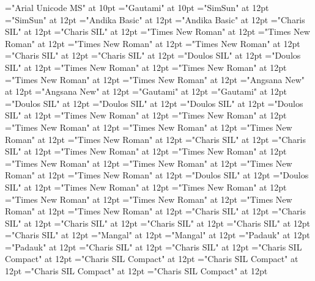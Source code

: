 \documentclass[a4paper,twoside]{article}
\begin{document}
\font\xitemhi="Arial Unicode MS" at 10pt
\font\xitemte="Gautami" at 10pt
\font\spanzhCN="SimSun" at 12pt
\font\divzhCN="SimSun" at 12pt
\font\spanzhCNpinyin="Andika Basic" at 12pt
\font\divzhCNpinyin="Andika Basic" at 12pt
\font\spanvi="Charis SIL" at 12pt
\font\divvi="Charis SIL" at 12pt
\font\spanur="Times New Roman" at 12pt
\font\divur="Times New Roman" at 12pt
\font\spanurxind="Times New Roman" at 12pt
\font\divurxind="Times New Roman" at 12pt
\font\spantr="Charis SIL" at 12pt
\font\divtr="Charis SIL" at 12pt
\font\spantrfonipa="Doulos SIL" at 12pt
\font\divtrfonipa="Doulos SIL" at 12pt
\font\spantrfonipaxemic="Times New Roman" at 12pt
\font\divtrfonipaxemic="Times New Roman" at 12pt
\font\spantpi="Times New Roman" at 12pt
\font\divtpi="Times New Roman" at 12pt
\font\spanth="Angsana New" at 12pt
\font\divth="Angsana New" at 12pt
\font\spante="Gautami" at 12pt
\font\divte="Gautami" at 12pt
\font\spanseh="Doulos SIL" at 12pt
\font\divseh="Doulos SIL" at 12pt
\font\spansehfonipaxetic="Doulos SIL" at 12pt
\font\divsehfonipaxetic="Doulos SIL" at 12pt
\font\spanru="Times New Roman" at 12pt
\font\divru="Times New Roman" at 12pt
\font\spanqvz="Times New Roman" at 12pt
\font\divqvz="Times New Roman" at 12pt
\font\spanqaaxper="Times New Roman" at 12pt
\font\divqaaxper="Times New Roman" at 12pt
\font\spanqaaxmam="Charis SIL" at 12pt
\font\divqaaxmam="Charis SIL" at 12pt
\font\spanqaaxcam="Times New Roman" at 12pt
\font\divqaaxcam="Times New Roman" at 12pt
\font\spanqaaQMxpersp="Times New Roman" at 12pt
\font\divqaaQMxpersp="Times New Roman" at 12pt
\font\spanqaaQMxperbk="Times New Roman" at 12pt
\font\divqaaQMxperbk="Times New Roman" at 12pt
\font\spanqaafonipaxyii="Doulos SIL" at 12pt
\font\divqaafonipaxyii="Doulos SIL" at 12pt
\font\spanqaafonipaxperetic="Times New Roman" at 12pt
\font\divqaafonipaxperetic="Times New Roman" at 12pt
\font\spanpt="Times New Roman" at 12pt
\font\divpt="Times New Roman" at 12pt
\font\spanpis="Times New Roman" at 12pt
\font\divpis="Times New Roman" at 12pt
\font\spanpac="Charis SIL" at 12pt
\font\divpac="Charis SIL" at 12pt
\font\spanpacfonipa="Charis SIL" at 12pt
\font\divpacfonipa="Charis SIL" at 12pt
\font\spannko="Charis SIL" at 12pt
\font\divnko="Charis SIL" at 12pt
\font\spanne="Mangal" at 12pt
\font\divne="Mangal" at 12pt
\font\spanmy="Padauk" at 12pt
\font\divmy="Padauk" at 12pt
\font\spanms="Charis SIL" at 12pt
\font\divms="Charis SIL" at 12pt
\font\spanlmp="Charis SIL Compact" at 12pt
\font\divlmp="Charis SIL Compact" at 12pt
\font\spanlgr="Charis SIL Compact" at 12pt
\font\divlgr="Charis SIL Compact" at 12pt
\font\spanlgrSBfonipaxetic="Charis SIL Compact" at 12pt
\end{document}
